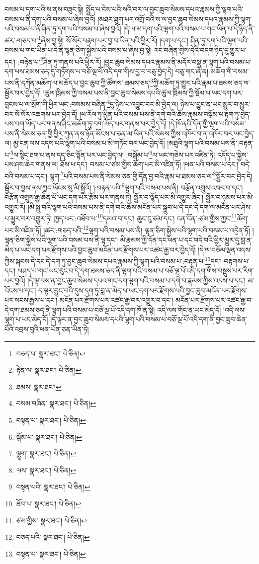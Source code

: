 བསམ་པ་དག་པའི་ས་ནས་བཟུང་སྟེ། སྤྱོད་པ་ངེས་པའི་སའི་བར་ལ་བྱང་ཆུབ་སེམས་དཔའ་རྣམས་ཀྱི་ལྷག་པའི་བསམ་པ་ནི་དག་པའི་བསམ་པ་ཞེས་བྱའོ། །མཐར་ཐུག་པར་འགྲོ་བའི་ས་ལ་བྱང་ཆུབ་སེམས་དཔའ་རྣམས་ཀྱི་ལྷག་པའི་བསམ་པ་ནི་ཤིན་ཏུ་དག་པའི་བསམ་པ་ཞེས་བྱའོ། །དེ་ལ་མ་དག་པའི་ལྷག་པའི་བསམ་པ་གང་ཡིན་པ་དེ་ཉིད་ནི་ཚར་:གཅད་པ་\footnote{བཅད་པ་  སྣར་ཐང་།  པེ་ཅིན། }ཞེས་བྱ་སྟེ། སོ་སོར་བརྟག་པར་བྱ་བ་ཡིན་པའི་ཕྱིར་རོ། །དག་པ་དང་། ཤིན་ཏུ་དག་པའི་ལྷག་པའི་བསམ་པ་གང་ཡིན་པ་དེ་ནི་ལྷན་ཅིག་སྐྱེས་པའི་བསམ་པ་ཞེས་བྱ་སྟེ། རང་བཞིན་གྱིས་དེའི་བདག་ཉིད་དུ་གྱུར་པ་དང་། :བརྟེན་པ་\footnote{རྟེན་ལ་  སྣར་ཐང་།  པེ་ཅིན། }ཤིན་ཏུ་གནས་པའི་ཕྱིར་རོ། །བྱང་ཆུབ་སེམས་དཔའ་རྣམས་ནི་མདོར་བསྡུ་ན་ལྷག་པའི་བསམ་པ་དག་པས་ཐམས་ཅད་དུ་གཏོགས་པ་བཅོ་ལྔ་པོ་འདི་དག་གིས་བྱ་བ་བཅུ་བྱེད་དེ། བཅུ་གང་ཞེ་ན། མཆོག་གི་བསམ་པས་ནི་དཀོན་མཆོག་ལ་མཆོད་པ་བྱང་ཆུབ་ཀྱི་ཚོགས་:ཐམས་ཅད་\footnote{ཐམས་  སྣར་ཐང་། }ཀྱི་མཆོག་ཏུ་གྱུར་པའི་རྣམ་པ་ཐམས་ཅད་ལ་སྦྱོར་བར་བྱེད་དོ། །ཚུལ་ཁྲིམས་ཀྱི་བསམ་པས་ནི་བྱང་ཆུབ་སེམས་དཔའི་ཚུལ་ཁྲིམས་ཀྱི་སྡོམ་པ་ཡང་དག་པར་བླངས་པ་ལ་སྲོག་གི་ཕྱིར་ཡང་:བསམས་བཞིན་\footnote{བསམ་བཞིན་  སྣར་ཐང་།  པེ་ཅིན། }དུ་ཉེས་པ་འབྱུང་བར་མི་བྱེད་ལ། ཉེས་པ་བྱུང་ན་ཡང་མྱུར་བ་མྱུར་བར་སོ་སོར་འཆགས་པར་བྱེད་དོ། །ཕ་རོལ་ཏུ་ཕྱིན་པའི་བསམ་པས་ནི་དགེ་བའི་ཆོས་རྣམས་བསྒོམ་པ་རྟག་ཏུ་བྱེད་པས་བག་ཡོད་པར་གནས་ཤིང་མཆོག་ཏུ་བག་ཡོད་པར་གནས་པར་བྱེད་དོ། །དེ་ཁོ་ནའི་དོན་གྱི་ལྷག་པའི་བསམ་པས་ནི་སེམས་ཅན་གྱི་ཕྱིར་ཀུན་ནས་ཉོན་མོངས་པ་ཅན་མ་ཡིན་པའི་སེམས་ཀྱིས་འཁོར་བ་ན་འཁོར་བར་ཡང་བྱེད་ལ། མྱ་ངན་ལས་འདས་པའི་ལྷག་པའི་བསམ་པ་མི་གཏོང་བར་ཡང་བྱེད་དོ། །མཐུའི་ལྷག་པའི་བསམ་པས་ནི་:བརྟན་པ་\footnote{བསྟན་པ་  སྣར་ཐང་།  པེ་ཅིན། }ལ་སྙིང་ཐག་པ་ནས་དད་ཅིང་སྟོན་པར་ཡང་བྱེད་ལ། :བསྒོམ་པ་\footnote{སྒོམ་པ་  སྣར་ཐང་།  པེ་ཅིན། }ལ་ཡང་གཅེས་པར་འཛིན་ཏེ། འདོད་པ་སྐྱེས་པས་ཤས་ཆེར་གནས་ལ། ཐོས་པ་དང་། བསམ་པ་ཙམ་གྱིས་ཆོག་པར་མི་འཛིན་ཏོ། །ཕན་པའི་བསམ་པ་དང་། བདེ་བའི་བསམ་པ་དང་། ལྷག་\footnote{ལྷུག་  སྣར་ཐང་།  པེ་ཅིན། }པའི་བསམ་པས་ནི་སེམས་ཅན་གྱི་དོན་བྱ་བའི་རྣམ་པ་ཐམས་ཅད་ལ་\footnote{ལས་  སྣར་ཐང་།  པེ་ཅིན། }སྦྱོར་བར་བྱེད་དེ། སྦྱོར་བ་བྱས་ནས་ཀྱང་ཡོངས་སུ་མི་སྐྱོའོ། །:བརྟན་པའི་\footnote{བསྟན་པའི་  སྣར་ཐང་།  པེ་ཅིན། }ལྷག་པའི་བསམ་པས་ནི། བརྩོན་འགྲུས་འབར་བ་དང་། བརྩོན་འགྲུས་རྒྱ་ཆེན་པོ་ཡང་དག་པར་རྩོམ་པར་གནས་ཏེ། སྦྱོར་བ་ལྷོད་པར་མི་འགྱུར་ཞིང་། སྦྱོར་བ་ཉམས་པར་མི་འགྱུར་རོ། །མི་སླུ་བའི་ལྷག་པའི་བསམ་པས་ནི་དགེ་བའི་ཆོས་མངོན་པར་སྒྲུབ་པ་དེ་དང་དེ་དག་ལ་མངོན་པར་ཤེས་པ་མྱུར་བར་འགྱུར་ཏེ། ཁྱད་པར་:འཐོབ་པ་\footnote{ཐོབ་པ་  སྣར་ཐང་།  པེ་ཅིན། }དམའ་བ་དང་། ཆུང་ངུ་ཙམ་དང་། ངན་ངོན་:ཙམ་གྱིས་ཀྱང་\footnote{ཙམ་གྱིས་  སྣར་ཐང་།  པེ་ཅིན། }ཆོག་པར་མི་འཛིན་ཏོ། །ཚར་:གཅད་པའི་\footnote{བཅད་པའི་  སྣར་ཐང་།  པེ་ཅིན། }ལྷག་པའི་བསམ་པས་ནི། ལྷན་ཅིག་སྐྱེས་པའི་ལྷག་པའི་བསམ་པ་འདྲེན་ཏོ། །ལྷན་ཅིག་སྐྱེས་པའི་ལྷག་པའི་བསམ་པས་ནི་ལྷ་དང་། མི་རྣམས་ཀྱི་དོན་དང་ཕན་པ་དང་བདེ་བའི་ཕྱིར་མྱུར་དུ་བླ་ན་མེད་པ་ཡང་དག་པར་རྫོགས་པའི་བྱང་ཆུབ་མངོན་པར་རྫོགས་པར་འཚང་རྒྱ་བར་བྱེད་དོ། །དེ་ལ་བཅོམ་ལྡན་འདས་ཀྱིས་སྐབས་དེ་དང་དེ་དག་ཏུ་བྱང་ཆུབ་སེམས་དཔའ་རྣམས་ཀྱི་ལྷག་པའི་བསམ་པ་:བརྟན་པ་\footnote{བསྟན་པ་  སྣར་ཐང་།  པེ་ཅིན། }དང་། བརྟགས་པ་དང་། བཤད་པ་གང་ཡང་རུང་བ་དེ་དག་ཐམས་ཅད་ནི་ལྷག་པའི་བསམ་པ་བཅོ་ལྔ་པོ་འདི་དག་གིས་བསྡུས་པར་རིག་པར་བྱའོ། །དེ་ལྟ་བས་ན་བྱང་ཆུབ་སེམས་དཔའ་གང་དག་ལྷག་པའི་བསམ་པ་དགེ་བ་རྣམས་ཀྱིས་འདས་པ་དང་། མ་འོངས་པ་དང་། ད་ལྟར་བྱུང་བའི་དུས་དག་ཏུ་བླ་ན་མེད་པ་ཡང་དག་པར་རྫོགས་པའི་བྱང་ཆུབ་མངོན་པར་རྫོགས་པར་སངས་རྒྱས་པ་དང་། མངོན་པར་རྫོགས་པར་འཚང་རྒྱ་བར་འགྱུར་བ་དང་། མངོན་པར་རྫོགས་པར་འཚང་རྒྱ་བ་དེ་དག་ཐམས་ཅད་ནི་ལྷག་པའི་བསམ་པ་བཅོ་ལྔ་པོ་འདི་དག་ཁོ་ན་སྟེ། འདི་ལས་གོང་ན་ཡང་མེད་དོ། །འདི་ལས་ལྷག་པ་ཡང་མེད་དོ། །དེ་ལྟར་ན་བྱང་ཆུབ་སེམས་དཔའི་ལྷག་པའི་བསམ་པ་བཅོ་ལྔ་པོ་འདི་དག་ནི་བྱང་ཆུབ་ཆེན་པོའི་འབྲས་བུའི་ཕན་ཡོན་ཅན་ཡིན་ཏེ། 